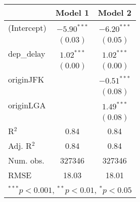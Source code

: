 
\begin{tabular}{l c c }
\hline
 & Model 1 & Model 2 \\
\hline
(Intercept) & $-5.90^{***}$ & $-6.20^{***}$ \\
            & $(0.03)$      & $(0.05)$      \\
dep\_delay  & $1.02^{***}$  & $1.02^{***}$  \\
            & $(0.00)$      & $(0.00)$      \\
originJFK   &               & $-0.51^{***}$ \\
            &               & $(0.08)$      \\
originLGA   &               & $1.49^{***}$  \\
            &               & $(0.08)$      \\
\hline
R$^2$       & 0.84          & 0.84          \\
Adj. R$^2$  & 0.84          & 0.84          \\
Num. obs.   & 327346        & 327346        \\
RMSE        & 18.03         & 18.01         \\
\hline
\multicolumn{3}{l}{\scriptsize{$^{***}p<0.001$, $^{**}p<0.01$, $^*p<0.05$}}
\end{tabular}
